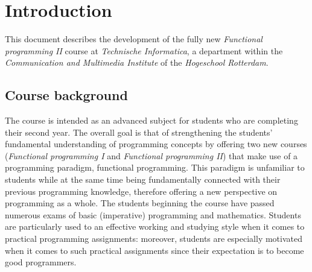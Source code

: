 \documentclass[a4paper, 10pt]{article}
\begin{document}


\newpage
\tableofcontents
\newpage

\shadowsectionbox

\section{Introduction}
This document describes the development of the fully new \textit{Functional programming II} course at \textit{Technische Informatica}, a department within the \textit{Communication and Multimedia Institute} of the \textit{Hogeschool Rotterdam}. 

\subsection{Course background}
The course is intended as an advanced subject for students who are completing their second year. The overall goal is that of strengthening the students' fundamental understanding of programming concepts by offering two new courses (\textit{Functional programming I} and \textit{Functional programming II}) that make use of a programming paradigm, functional programming. This paradigm is unfamiliar to students while at the same time being fundamentally connected with their previous programming knowledge, therefore offering a new perspective on programming as a whole. The students beginning the course have passed numerous exams of basic (imperative) programming and mathematics. Students are particularly used to an effective working and studying style when it comes to practical programming assignments: moreover, students are especially motivated when it comes to such practical assignments since their expectation is to become good programmers.



\newpage
\end{document}
